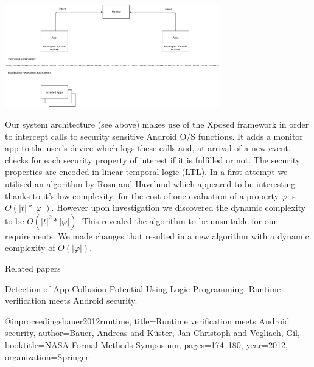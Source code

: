 \documentclass[runningheads]{llncs}
\begin{document}
\begin{center}
\includegraphics[width=0.7\textwidth]{HighLevelArchitecture.pdf}
\end{center}

Our system architecture (see above) makes use of the Xposed framework \cite{rovo89} in order to intercept calls to security sensitive Android O/S functions.  It adds a monitor app to the user's device which logs these calls and, at arrival of a new event, checks for each security property of interest if it is fulfilled or not.  The security properties are encoded in linear temporal logic (LTL).  In a first attempt we utilised an algorithm by Rosu and Havelund \cite{RosuHavelund} which appeared to be interesting thanks to it's low complexity: for the cost of one evaluation of a property $ \varphi $ is $ O(|t| * |\varphi|) $.  However upon investigation we discovered the dynamic complexity to be $ O(|t|^2 * |\varphi|) $.  This revealed the algorithm to be unsuitable for our requirements.  We made changes that resulted in a new algorithm with a dynamic complexity of $ O(|\varphi|) $.

Related papers

Detection of App Collusion Potential Using Logic Programming.  \cite{PrologAppCollusion}
Runtime verification meets Android security.  \cite{bauer2012runtime}





@inproceedings{bauer2012runtime,
	title={Runtime verification meets Android security},
	author={Bauer, Andreas and K{\"u}ster, Jan-Christoph and Vegliach, Gil},
	booktitle={NASA Formal Methods Symposium},
	pages={174--180},
	year={2012},
	organization={Springer}
}
\end{document}
